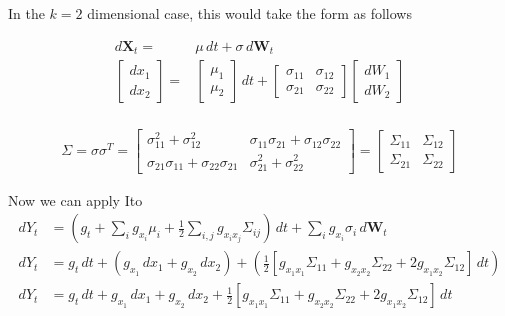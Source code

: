 \documentclass[11pt]{article}
\begin{document}
In the $k=2$ dimensional case, this would take the form as follows 

\begin{align*}
    d\boldsymbol{X}_t =& \mu\,dt + \sigma \,d\boldsymbol{W}_t \\
    \begin{bmatrix} dx_1 \\ dx_2 \end{bmatrix} =& \begin{bmatrix} \mu_1 \\ \mu_2 \end{bmatrix}
    \,dt + \begin{bmatrix} \sigma_{11} & \sigma_{12} \\ \sigma_{21} & \sigma_{22} 
    \end{bmatrix} \begin{bmatrix} dW_1 \\ dW_2 \end{bmatrix} \\
\end{align*}

\begin{align*}
    \Sigma = \sigma \sigma^T = \begin{bmatrix}
        \sigma_{11}^2 + \sigma_{12}^2 & \sigma_{11} \sigma_{21} + \sigma_{12} \sigma_{22} \\
        \sigma_{21} \sigma_{11} + \sigma_{22} \sigma_{21} &  \sigma_{21}^2 + \sigma_{22}^2
    \end{bmatrix} = 
    \begin{bmatrix}
        \Sigma_{11} & \Sigma_{12} \\ 
        \Sigma_{21} & \Sigma_{22}
    \end{bmatrix}
\end{align*}

Now we can apply Ito
\begin{align*}
    dY_t &= \left(g_t + \sum_{i} g_{x_i} \mu_i + \frac{1}{2} \sum_{i,j} g_{x_i x_j} \Sigma_{ij}
    \right)\,dt + \sum_{i} g_{x_i} \sigma_i \,d\boldsymbol{W}_t \\
    dY_t &= g_t\,dt + (g_{x_1}\,dx_1 + g_{x_2}\,dx_2) + (\frac{1}{2}[g_{x_1x_1} \Sigma_{11} +
    g_{x_2x_2} \Sigma_{22} + 2 g_{x_1x_2} \Sigma_{12}]\,dt) \\
    dY_t &= g_t\,dt + g_{x_1}\,dx_1 + g_{x_2}\,dx_2 + \frac{1}{2}[g_{x_1x_1} \Sigma_{11} +
    g_{x_2x_2} \Sigma_{22} + 2 g_{x_1x_2} \Sigma_{12}]\,dt \\
\end{align*}
\end{document}
